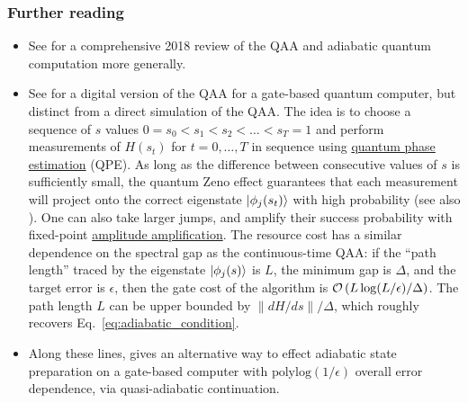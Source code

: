 \begin{refsection}

\subsubsection*{Further reading}

\begin{itemize}
    \item See \cite{albash2018AQCreview} for a comprehensive 2018 review of the QAA and adiabatic quantum computation more generally.
    \item See \cite{boixo2010FastQuantumAlgorithms} for a digital version of the QAA for a gate-based quantum computer, but distinct from a direct simulation of the QAA. The idea is to choose a sequence of $s$ values $0 = s_0 < s_1 < s_2 < \ldots < s_T = 1$ and perform measurements of $H(s_t)$ for $t=0, \ldots, T$ in sequence using \hyperref[prim:QPE]{quantum phase estimation} (QPE). As long as the difference between consecutive values of $s$ is sufficiently small, the quantum Zeno effect guarantees that each measurement will project onto the correct eigenstate $\lvert\phi_j(s_t)\rangle$ with high probability (see also \cite{somma2007QuantumSimulatedAnnealing}). One can also take larger jumps, and amplify their success probability with fixed-point \hyperref[prim:AmpAmp]{amplitude amplification}. The resource cost has a similar dependence on the spectral gap as the continuous-time QAA: if the ``path length'' traced by the eigenstate $\lvert\phi_j(s)\rangle$ is $L$, the minimum gap is $\Delta$, and the target error is $\epsilon$, then the gate cost of the algorithm is $\mathcal{O}\left( L\log(L/\epsilon)/\Delta \right)$. The path length $L$ can be upper bounded by $\lVert dH/ds \rVert/\Delta$, which roughly recovers Eq.~\eqref{eq:adiabatic_condition}. 
    \item Along these lines, \cite{wan2020FastDigitalMethodsForAdiabatic} gives an alternative way to effect adiabatic state preparation on a gate-based computer with $\mathrm{polylog}(1/\epsilon)$ overall error dependence, via quasi-adiabatic continuation. 
\end{itemize}
\printbibliography[heading=secbib,segment=\therefsegment]

\end{refsection}